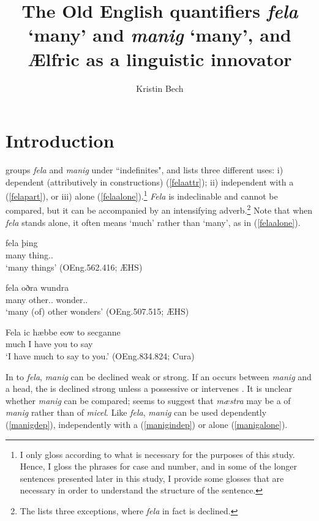 \documentclass[output=paper,colorlinks,citecolor=brown]{langscibook}
\author{Kristin Bech\orcid{}\affiliation{University of Oslo}}
\title[The Old English quantifiers \textnormal{fela} ‘many’ and \textnormal{manig} ‘many’]{The Old English quantifiers \textit{fela} ‘many’ and \textit{manig} ‘many’, and Ælfric as a linguistic innovator}
\begin{document}
\maketitle

\section{Introduction}

\citet[vol. I, 172--174]{Mitchell85} groups \textit{fela} and \textit{manig} under ``indefinites", and lists three different uses: i) dependent (attributively in  constructions) (\ref{felaattr}); ii) independent with a   (\ref{felapart}), or iii) alone (\ref{felaalone}).\footnote{I only gloss according to what is necessary for the purposes of this study. Hence, I gloss the  phrases for case and number, and in some of the longer sentences presented later in this study, I provide some glosses that are necessary in order to understand the structure of the sentence.} \textit{Fela} is indeclinable and cannot be compared, but it can be accompanied by an intensifying adverb.\footnote{The \citet{DOE} lists three exceptions, where \textit{fela} in fact is declined.} Note that when \textit{fela} stands alone, it often means ‘much’ rather than ‘many’, as in (\ref{felaalone}).

\ea\label{felaattr}
\gll fela þing\\
	many thing.\ACC.\PL{}\\
\glt ‘many things’ (OEng.562.416; ÆHS)
\z

\ea\label{felapart}
\gll fela oðra wundra \\
	many other.\GEN.\PL{} wonder.\GEN.\PL{}\\
\glt‘many (of) other wonders’ (OEng.507.515; ÆHS)
\z

\ea\label{felaalone}
\gll Fela ic hæbbe eow to secganne\\
	much I have you to say\\
\glt ‘I have much to say to you.’ (OEng.834.824; Cura)
\z

 In  to \textit{fela}, \textit{manig} can be declined weak or strong. If an  occurs between \textit{manig} and a  head, the  is declined strong unless a possessive or  intervenes \citep[vol. I, 61]{Mitchell85}. It is unclear whether \textit{manig} can be compared; \citet[vol. I, 174 fn. 112]{Mitchell85} seems to suggest that \textit{mæstra} may be a  of \textit{manig} rather than of \textit{micel}. Like \textit{fela}, \textit{manig} can be used dependently (\ref{manigdep}), independently with a   (\ref{manigindep}) or alone (\ref{manigalone}).
\end{document}
